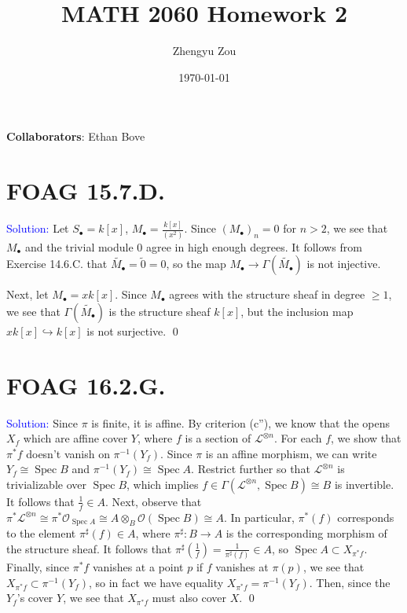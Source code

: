 \documentclass[11pt]{article}
\title{MATH 2060 Homework 2}
\author{Zhengyu Zou}
\date{\today}
\newcommand{\cL}{\mathcal{L}}
\newcommand{\cO}{\mathcal{O}}
\DeclareMathOperator{\Spec}{\operatorname{Spec}}
\newenvironment{solution}{\begin{trivlist}\item[]{\textcolor{blue}{Solution:}}}{\qed \end{trivlist}}
\begin{document}
\maketitle

\textbf{Collaborators}: Ethan Bove

\section*{FOAG 15.7.D.}

\begin{solution}
	Let $S_{\bullet} = k[x]$, $M_{\bullet} = \frac{k[x]}{(x^2)}$. Since $(M_{\bullet})_n = 0$ for $n > 2$, we see that $M_{\bullet}$ and the trivial module $0$ agree in high enough degrees. It follows from Exercise 14.6.C. that $\widetilde{M_{\bullet}} = \widetilde{0} = 0$, so the map $M_{\bullet} \rightarrow \Gamma(\widetilde{M_{\bullet}})$ is not injective. 

	Next, let $M_{\bullet} = xk[x]$. Since $M_{\bullet}$ agrees with the structure sheaf in degree $ \geq 1$, we see that $\Gamma(\widetilde{M_{\bullet}})$ is the structure sheaf $k[x]$, but the inclusion map $xk[x] \hookrightarrow k[x]$ is not surjective. 
\end{solution}

\newpage

\section*{FOAG 16.2.G.}

\begin{solution}
    Since $\pi$ is finite, it is affine. By criterion (c''), we know that the opens $X_f$ which are affine cover $Y$, where $f$ is a section of $\cL^{\otimes n}$. For each $f$, we show that $\pi^*f$ doesn't vanish on $\pi^{-1}(Y_f)$. Since $\pi$ is an affine morphism, we can write $Y_f \cong \Spec B$ and $\pi^{-1}(Y_f) \cong \Spec A$. Restrict further so that $\cL^{\otimes n}$ is trivializable over $\Spec B$, which implies $f \in \Gamma(\cL^{\otimes n}, \Spec B) \cong B$ is invertible. It follows that $\frac{1}{f} \in A$. Next, observe that $\pi^* \cL^{\otimes n} \cong \pi^* \cO_{\Spec A} \cong A \otimes_B \cO(\Spec B) \cong A$. In particular, $\pi^*(f)$ corresponds to the element $\pi^{\sharp}(f) \in A$, where $\pi^{\sharp}: B \rightarrow A$ is the corresponding morphism of the structure sheaf. It follows that $\pi^{\sharp}(\frac{1}{f}) = \frac{1}{\pi^{\sharp}(f)} \in A$, so $\Spec A \subset X_{\pi^*f}$. Finally, since $\pi^*f$ vanishes at a point $p$ if $f$ vanishes at $\pi(p)$, we see that $X_{\pi^* f} \subset \pi^{-1}(Y_f)$, so in fact we have equality $X_{\pi^* f} = \pi^{-1}(Y_f)$. Then, since the $Y_f$'s cover $Y$, we see that $X_{\pi^* f}$ must also cover $X$. 
\end{solution}
\end{document}
